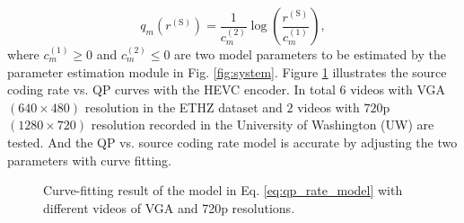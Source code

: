 \documentclass[journal]{IEEEtran}
\begin{document}
\begin{equation}\label{eq:qp_rate_model}
q_m\left(r^{\left(\text{S}\right)}\right) = \frac{1}{c_m^{\left(2\right)} }\log\left(\frac{r^{\left(\text{S}\right)}}{c_m^{\left(1\right)} }\right),
\end{equation}
where $c_m^{\left(1\right)} \geq 0$ and $c_m^{\left(2\right)} \leq 0$ are two model parameters to be estimated by the parameter estimation module in Fig. \ref{fig:system}. Figure \ref{fig:qp_rate_model} illustrates the source coding rate vs. QP curves with the HEVC encoder. In total $6$ videos with VGA $\left(640\times 480\right)$ resolution in the ETHZ dataset \cite{ELSG08} and $2$ videos with $720$p $\left(1280\times 720\right)$ resolution recorded in the University of Washington (UW) are tested. And the QP vs. source coding rate model is accurate by adjusting the two parameters with curve fitting. 

\begin{figure}[b]
\caption{Curve-fitting result of the model in Eq. \eqref{eq:qp_rate_model} with different videos of VGA and 720p resolutions.}\label{fig:qp_rate_model}
\end{figure}
\end{document}
